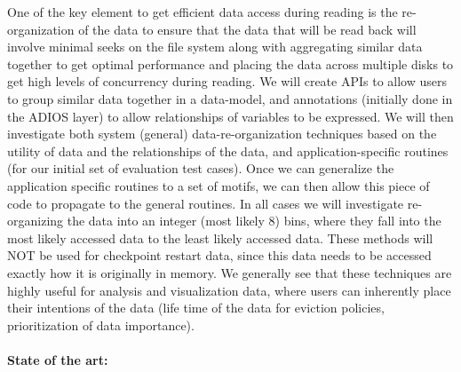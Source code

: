 One of the key element to get efficient data access during reading is the re-organization of the
data to ensure that the data that will be read back will involve minimal seeks on the file system 
along with aggregating similar data together to get optimal performance and placing the data
across multiple disks to get high levels of concurrency during reading. We will create APIs to
allow users to group similar data together in a data-model, and annotations (initially done in the
ADIOS layer) to allow relationships of variables to be expressed. We will then investigate both
system (general) data-re-organization techniques based on the utility of data and the relationships
of the data, and application-specific routines (for our initial set of evaluation test cases).  Once
we can generalize the application specific routines to a set of motifs, we can then allow this piece
of code to propagate to the general routines. In all cases we will investigate re-organizing the data
into an integer (most likely 8) bins, where they fall into the most likely accessed data to the least
likely accessed data. These methods will NOT be used for checkpoint restart data, since this
data needs to be accessed exactly how it is originally in memory.  We generally see that these
techniques are highly useful for analysis and  visualization data, where users can inherently place
their intentions of the data (life time of the data for eviction policies, prioritization of data 
importance). 


\paragraph{State of the art:}

